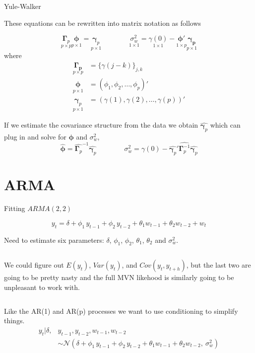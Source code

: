 \documentclass[11pt,ignorenonframetext,]{beamer}
\let\oldShaded\Shaded
\let\endoldShaded\endShaded
\let\oldverbatim\verbatim
\let\endoldverbatim\endverbatim
\newcommand{\tinyoutput}{
  \renewenvironment{Shaded}{\tiny\begin{spacing}{0.9}\oldShaded}{\endoldShaded\end{spacing}}
  \renewenvironment{verbatim}{\tiny\begin{spacing}{0.9}\oldverbatim}{\endoldverbatim\end{spacing}}
}
\begin{document}
\begin{frame}[t]{Yule-Walker}
\protect\hypertarget{yule-walker}{}

These equations can be rewritten into matrix notation as follows

\[
\underset{p \times p}{\symbf\Gamma_p} \underset{p \times 1}{\symbf\phi} = \underset{p \times 1}{\symbf\gamma_p}
\qquad\qquad
\underset{1 \times 1}{\sigma^2_w} = \underset{1 \times 1}{\gamma(0)} - \underset{1 \times p}{\symbf{\phi'}}\underset{p \times 1}{\symbf{\gamma_p}}
\] where \[ 
\begin{aligned}
\underset{p \times p}{\symbf{\Gamma_p}} &= \{\gamma(j-k)\}_{j,k} \\
\underset{p \times 1}{\symbf\phi} &= (\phi_1, \phi_2, \ldots, \phi_p)' \\
\underset{p \times 1}{\symbf\gamma_p} &= (\gamma(1), \gamma(2), \ldots, \gamma(p))'
\end{aligned}
\]

\pause

If we estimate the covariance structure from the data we obtain
\(\hat{\symbf\gamma_p}\) which can plug in and solve for
\(\symbf{\phi}\) and \(\sigma^2_w\), \[
\hat{\symbf\phi} =\hat{\symbf{\Gamma}_p}^{-1}\hat{\symbf{\gamma}_p}
\qquad\qquad
\sigma^2_w = \gamma(0) - \hat{\symbf{\gamma}_p}' \hat{\symbf{\Gamma}_p^{-1}} \hat{\symbf{\gamma}_p}
\]

\end{frame}

\hypertarget{arma}{%
\section{ARMA}\label{arma}}

\begin{frame}[t]{Fitting \(ARMA(2,2)\)}
\protect\hypertarget{fitting-arma22}{}

\[ y_t = \delta + \phi_1 \, y_{t-1} + \phi_2 \, y_{t-2} + \theta_1 w_{t-1} + \theta_2 w_{t-2} + w_t \]

Need to estimate six parameters: \(\delta\), \(\phi_1\), \(\phi_2\),
\(\theta_1\), \(\theta_2\) and \(\sigma_w^2\).

\pause

\(~\)

We could figure out \(E(y_t)\), \(Var(y_t)\), and \(Cov(y_t, y_{t+h})\),
but the last two are going to be pretty nasty and the full MVN likehood
is similarly going to be unpleasant to work with.

\pause

\(~\)

Like the AR(1) and AR(p) processes we want to use conditioning to
simplify things. \tinyoutput \[
\begin{aligned}
y_t | \delta, &y_{t-1}, y_{t-2}, w_{t-1}, w_{t-2} \\ 
&\sim \mathcal{N}(\delta + \phi_1 \, y_{t-1} + \phi_2 \, y_{t-2} + \theta_1 w_{t-1} + \theta_2 w_{t-2},~\sigma_w^2) 
\end{aligned}
\]

\end{frame}
\end{document}
